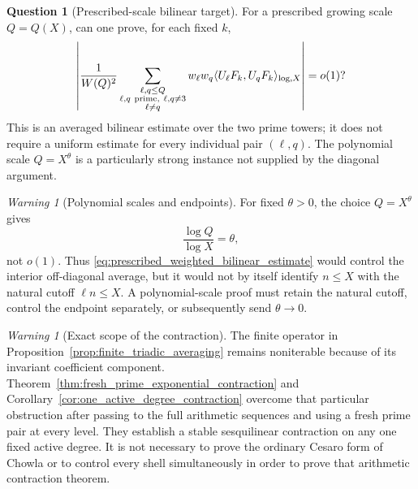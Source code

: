 \documentclass[11pt]{amsart}
\numberwithin{equation}{section}
\theoremstyle{plain}
\theoremstyle{definition}
\newtheorem{question}[theorem]{Question}
\theoremstyle{remark}
\newtheorem{warning}[theorem]{Warning}
\begin{document}
\begin{question}[Prescribed-scale bilinear target]
\label{question:prescribed_scale_bilinear_target}
For a prescribed growing scale $Q=Q(X)$, can one prove, for each fixed $k$,
\begin{equation}
\left|
\frac1{W(Q)^2}
\sum_{\substack{\ell,q\leq Q\\
\ell,q\ {\rm prime},\ \ell,q\neq3\\
\ell\neq q}}
w_\ell w_q
\langle U_\ell F_k,U_qF_k\rangle_{\log,X}
\right|
=o(1)?
\label{eq:prescribed_weighted_bilinear_estimate}
\end{equation}
This is an averaged bilinear estimate over the two prime towers; it does not require a uniform estimate for every individual pair $(\ell,q)$.  The polynomial scale $Q=X^\theta$ is a particularly strong instance not supplied by the diagonal argument.
\end{question}

\begin{warning}[Polynomial scales and endpoints]
\label{warn:polynomial_scale_endpoint_boundary}
For fixed $\theta>0$, the choice $Q=X^\theta$ gives
\begin{equation}
\frac{\log Q}{\log X}=\theta,
\label{eq:polynomial_scale_endpoint_ratio}
\end{equation}
not $o(1)$.  Thus \eqref{eq:prescribed_weighted_bilinear_estimate} would control the interior off-diagonal average, but it would not by itself identify $n\leq X$ with the natural cutoff $\ell n\leq X$.  A polynomial-scale proof must retain the natural cutoff, control the endpoint separately, or subsequently send $\theta\to0$.
\end{warning}

\begin{warning}[Exact scope of the contraction]
\label{warn:fresh_prime_iteration_scope}
The finite operator in Proposition~\ref{prop:finite_triadic_averaging} remains noniterable because of its invariant coefficient component.  Theorem~\ref{thm:fresh_prime_exponential_contraction} and Corollary~\ref{cor:one_active_degree_contraction} overcome that particular obstruction after passing to the full arithmetic sequences and using a fresh prime pair at every level.  They establish a stable sesquilinear contraction on any one fixed active degree.  It is not necessary to prove the ordinary Cesaro form of Chowla or to control every shell simultaneously in order to prove that arithmetic contraction theorem.
\end{warning}
\end{document}
